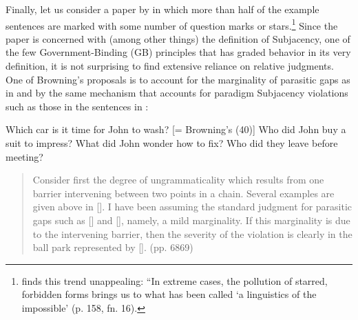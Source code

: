 Finally, let us consider a paper by \citet{Browning1987} in which more than half of the example sentences are marked with some number of question marks or stars.\footnote{\citet{Hagege1981} finds this trend unappealing: ``In extreme cases, the pollution of starred, forbidden forms brings us to what has been called `a linguistics of the impossible'{\textquotedbl} (p. 158, fn. 16).}
 Since the paper is concerned with (among other things) the definition of Subjacency, one of the few Government-Binding (GB) principles that has graded
behavior in its very definition, it is not surprising to find extensive reliance on relative judgments. One of Browning's proposals is to account for the marginality of parasitic gaps as in  and  by the same mechanism that accounts for paradigm Subjacency violations such as those in the sentences in :


\label{ex:2:11}
   \z

    
\label{ex:2:12}
\z

\ea \label{ex:2:13}
\ea
Which car is it time for John to wash? [= Browning's (40)]
\ex Who did John buy a suit to impress?
\ex What did John wonder how to fix?
\ex Who did they leave before meeting?\\
\z
\z

\begin{quote}
Consider first the degree of ungrammaticality which results from one barrier intervening between two points in a chain. Several examples are given above in []. I have been assuming the standard judgment for parasitic gaps such as [] and [], namely, a mild marginality. If this marginality is due to the intervening barrier, then the severity of the violation is clearly in the ball park represented by []. (pp. 68\textendash{}69)
\end{quote}

